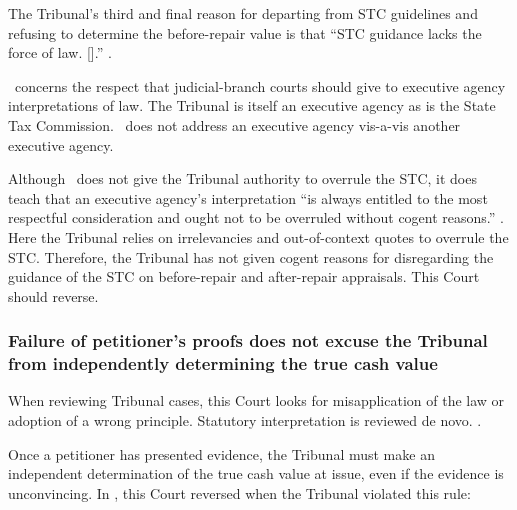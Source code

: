 \documentclass[12pt,\documentclassflag]{michiganCourtOfAppealsBrief}
\begin{document}
The Tribunal's third and final reason for departing from STC guidelines and refusing to determine the before-repair value is that ``STC guidance lacks the force of law. [].'' \reconsiderationDenied[2].

\cite[s]{Rovas}\ concerns the respect that judicial-branch courts should give to executive agency interpretations of law. The Tribunal is itself an executive agency as is the State Tax Commission. \cite[s]{Rovas}\ does not address an executive agency vis-a-vis another executive agency.

Although \cite[s]{Rovas}\ does not give the Tribunal authority to overrule the STC, it does teach that an executive agency's interpretation ``is always entitled to the most respectful consideration and ought not to be overruled without cogent reasons.'' . Here the Tribunal relies on irrelevancies and out-of-context quotes to overrule the STC.
Therefore, the Tribunal has not given cogent reasons for disregarding the guidance of the STC on before-repair and after-repair appraisals. This Court should reverse. 


\subsubsection{Failure of petitioner's proofs does not excuse the Tribunal from independently determining the true cash value}

When reviewing Tribunal cases, this Court looks for misapplication of the law or adoption of a wrong principle. Statutory interpretation is reviewed de novo. . 

Once a petitioner has presented evidence, the Tribunal must make an independent determination of the true cash value at issue, even if the evidence is unconvincing. In \cite{Jones & Laughlin}, this Court reversed when the Tribunal violated this rule:
\end{document}
